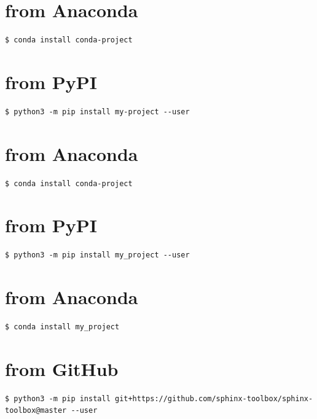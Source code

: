 \documentclass[letterpaper,10pt,english]{sphinxmanual}
\begin{document}
\chapter{from Anaconda}
\label{\detokenize{installation:installation-11-from_Anaconda}}
\begin{Verbatim}[commandchars=\\\{\}]
$ conda install conda-project
\end{Verbatim}


\chapter{from PyPI}
\label{\detokenize{installation:installation-12-from_PyPI}}\label{\detokenize{installation:installation-12}}
\begin{Verbatim}[commandchars=\\\{\}]
$ python3 -m pip install my-project --user
\end{Verbatim}


\chapter{from Anaconda}
\label{\detokenize{installation:installation-12-from_Anaconda}}
\begin{Verbatim}[commandchars=\\\{\}]
$ conda install conda-project
\end{Verbatim}


\chapter{from PyPI}
\label{\detokenize{installation:installation-13-from_PyPI}}\label{\detokenize{installation:installation-13}}
\begin{Verbatim}[commandchars=\\\{\}]
$ python3 -m pip install my_project --user
\end{Verbatim}


\chapter{from Anaconda}
\label{\detokenize{installation:installation-13-from_Anaconda}}
\begin{Verbatim}[commandchars=\\\{\}]
$ conda install my_project
\end{Verbatim}


\chapter{from GitHub}
\label{\detokenize{installation:installation-13-from_GitHub}}
\begin{Verbatim}[commandchars=\\\{\}]
$ python3 -m pip install git+https://github.com/sphinx-toolbox/sphinx-toolbox@master --user
\end{Verbatim}
\end{document}
